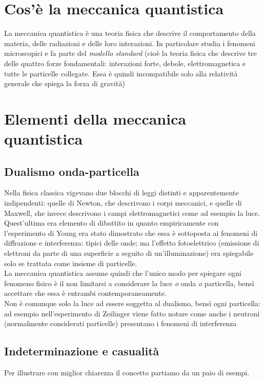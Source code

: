 \section{Cos'è la meccanica quantistica}
La meccanica quantistica è una teoria fisica che descrive il comportamento della materia, delle radiazioni e delle loro interazioni. In particolare studia i fenomeni microscopici e fa parte del \textit{modello standard} (cioè la teoria fisica che descrive tre delle quattro forze fondamentali: interazioni forte, debole, elettromagnetica e tutte le particelle collegate. Essa è quindi incompatibile solo alla relatività generale che spiega la forza di gravità)

\section{Elementi della meccanica quantistica}
\subsection{Dualismo onda-particella}
Nella fisica classica vigevano due blocchi di leggi distinti e apparentemente indipendenti: quelle di Newton, che descrivono i corpi meccanici, e quelle di Maxwell, che invece descrivono i campi elettromagnetici come ad esempio la luce. Quest'ultima era elemento di dibattito in quanto empiricamente con l'esperimento di Young era stato dimostrato che essa è sottoposta ai fenomeni di diffrazione e interferenza: tipici delle onde; ma l'effetto fotoelettrico (emissione di elettroni da parte di una superficie a seguito di un'illuminazione) era spiegabile solo se trattata come insieme di particelle.\\
La meccanica quantistica assume quindi che l'unico modo per spiegare ogni fenomeno fisico è il non limitarsi a considerare la luce \textit{o} onda \textit{o} particella, bensì accettare che essa è entrambi contemporaneamente.\\
Non è comunque solo la luce ad essere soggetta al dualismo, bensì ogni particella: ad esempio nell'esperimento di Zeilinger viene fatto notare come anche i neutroni (normalmente considerati particelle) presentano i fenomeni di interferenza
\subsection{Indeterminazione e casualità}
Per illustrare con miglior chiarezza il concetto partiamo da un paio di esempi.
